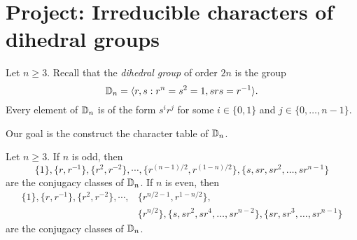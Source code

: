 \section{Project: Irreducible characters of dihedral groups}
Let $n\geq3$. 
Recall that the \emph{dihedral group} of order $2n$ 
is the group
\[
\mathbb{D}_{n}=\langle r,s:r^n=s^2=1,srs=r^{-1}\rangle. 
\]
Every element of $\mathbb{D}_{n}$ is of the form
$s^ir^j$ for some $i\in\{0,1\}$ and $j\in\{0,\dots,n-1\}$. 

Our goal is the construct the character table of $\mathbb{D}_{n}$. 

\begin{proposition}
\label{pro:classes_dihedral}
    Let $n\geq3$. If $n$ is odd, then 
    \[
    \{1\},
    \{r,r^{-1}\},
    \{r^2,r^{-2}\},
    \cdots,\{r^{(n-1)/2},r^{(1-n)/2}\},
    \{s,sr,sr^2,\dots,sr^{n-1}\}
    \]
    are the conjugacy classes of $\mathbb{D}_n$. If $n$ is even, then
    \begin{align*}
        \{1\},
    \{r,r^{-1}\},
    \{r^2,r^{-2}\},
    \cdots,&\{r^{n/2-1},r^{1-n/2}\},\\
    &\{r^{n/2}\},
    \{s,sr^2,sr^4,\dots,sr^{n-2}\},
    \{sr,sr^3,\dots,sr^{n-1}\}
    \end{align*}
    are the conjugacy classes of $\mathbb{D}_n$.
\end{proposition}

